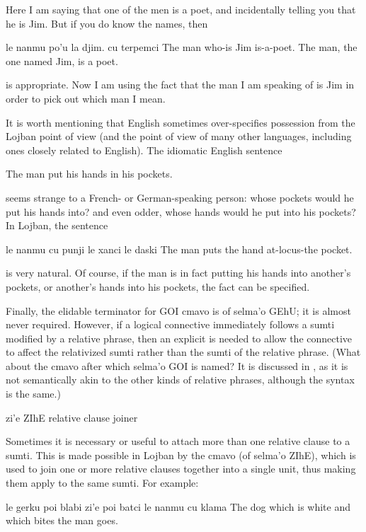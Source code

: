 Here I am saying that one of the men is a poet, and
    incidentally telling you that he is Jim. But if you do know the
    names, then
\begin{example}
le nanmu po'u la djim. cu terpemci\n
The man who-is Jim is-a-poet.\n
The man, the one named Jim, is a poet.
\end{example}

{\noindent}is appropriate. Now I am using the fact that the man I am
    speaking of is Jim in order to pick out which man I mean. 

It is worth mentioning that English sometimes over-specifies
    possession from the Lojban point of view (and the point of view
    of many other languages, including ones closely related to
    English). The idiomatic English sentence
\begin{example}
The man put his hands in his pockets.
\end{example}

{\noindent}seems strange to a French- or German-speaking person: whose
    pockets would he put his hands into? and even odder, whose
    hands would he put into his pockets? In Lojban, the sentence
\begin{example}
le nanmu cu punji le xanci le daski\n
The man puts the hand at-locus-the pocket.
\end{example}

{\noindent}is very natural. Of course, if the man is in fact putting his
    hands into another's pockets, or another's hands into his
    pockets, the fact can be specified. 

Finally, the elidable terminator for GOI cmavo is 
    of selma'o GEhU; it is almost never required. However, if a
    logical connective immediately follows a sumti modified by a
    relative phrase, then an explicit  is needed to allow
    the connective to affect the relativized sumti rather than the
    sumti of the relative phrase. (What about the cmavo after which
    selma'o GOI is named? It is discussed in , as it is not semantically akin
    to the other kinds of relative phrases, although the syntax is
    the same.)




   zi'e    ZIhE        relative clause joiner

Sometimes it is necessary or useful to attach more than one
    relative clause to a sumti. This is made possible in Lojban by
    the cmavo  (of selma'o ZIhE), which is used to join one
    or more relative clauses together into a single unit, thus
    making them apply to the same sumti. For example:
\begin{example}
le gerku poi blabi zi'e poi batci le nanmu cu klama\n
The dog which is white and which bites the man goes.
\end{example}

